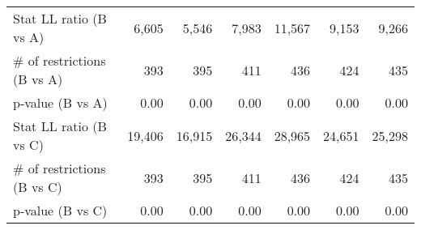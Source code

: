 \begin{tabular}{lllllll}
\multicolumn{1}{l}{\hspace{1em}Stat LL ratio (B vs A)} &
  \multicolumn{1}{|r}{6,605} &
  \multicolumn{1}{r}{5,546} &
  \multicolumn{1}{r}{7,983} &
  \multicolumn{1}{r}{11,567} &
  \multicolumn{1}{r}{9,153} &
  \multicolumn{1}{r}{9,266} \\
\multicolumn{1}{l}{\hspace{1em}$\#$ of restrictions (B vs A)} &
  \multicolumn{1}{|r}{393} &
  \multicolumn{1}{r}{395} &
  \multicolumn{1}{r}{411} &
  \multicolumn{1}{r}{436} &
  \multicolumn{1}{r}{424} &
  \multicolumn{1}{r}{435} \\
\multicolumn{1}{l}{\hspace{1em}p-value (B vs A)} &
  \multicolumn{1}{|r}{0.00} &
  \multicolumn{1}{r}{0.00} &
  \multicolumn{1}{r}{0.00} &
  \multicolumn{1}{r}{0.00} &
  \multicolumn{1}{r}{0.00} &
  \multicolumn{1}{r}{0.00} \\
\multicolumn{1}{l}{\hspace{1em}Stat LL ratio (B vs C)} &
  \multicolumn{1}{|r}{19,406} &
  \multicolumn{1}{r}{16,915} &
  \multicolumn{1}{r}{26,344} &
  \multicolumn{1}{r}{28,965} &
  \multicolumn{1}{r}{24,651} &
  \multicolumn{1}{r}{25,298} \\
\multicolumn{1}{l}{\hspace{1em}$\#$ of restrictions (B vs C)} &
  \multicolumn{1}{|r}{393} &
  \multicolumn{1}{r}{395} &
  \multicolumn{1}{r}{411} &
  \multicolumn{1}{r}{436} &
  \multicolumn{1}{r}{424} &
  \multicolumn{1}{r}{435} \\
\multicolumn{1}{l}{\hspace{1em}p-value (B vs C)} &
  \multicolumn{1}{|r}{0.00} &
  \multicolumn{1}{r}{0.00} &
  \multicolumn{1}{r}{0.00} &
  \multicolumn{1}{r}{0.00} &
  \multicolumn{1}{r}{0.00} &
  \multicolumn{1}{r}{0.00} \\
\cline{1-7}
\end{tabular}
